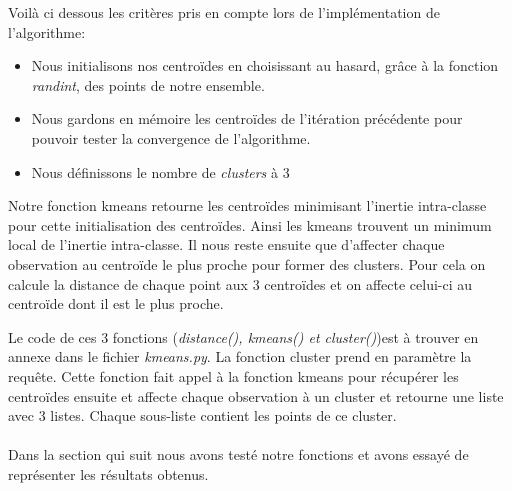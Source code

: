 \documentclass[]{report}
\begin{document}
	Voilà ci dessous les critères pris en compte lors de l'implémentation de l'algorithme:
	\begin{itemize}
		\item Nous initialisons nos centroïdes en choisissant au hasard, grâce à  la fonction \textit{randint}, des points de notre ensemble. 
		\item Nous gardons en mémoire les centroïdes de l'itération précédente pour pouvoir tester la convergence de l'algorithme.
		\item Nous définissons le nombre de \textit{clusters}  à 3
	\end{itemize}
	
	Notre fonction kmeans retourne les centroïdes minimisant l'inertie intra-classe pour cette initialisation des centroïdes. Ainsi les kmeans trouvent un minimum local de l'inertie intra-classe. Il nous reste ensuite que d'affecter chaque observation au centroïde le plus proche pour former des clusters. Pour cela on calcule la distance de chaque point aux 3 centroïdes et on affecte celui-ci au centroïde dont il est le  plus proche.\
	
	Le code de ces 3 fonctions (\textit{distance(), kmeans() et cluster()})est à trouver en annexe dans le fichier \textit{kmeans.py}. La fonction cluster prend en paramètre la requête. Cette fonction fait appel à la fonction kmeans pour récupérer les centroïdes ensuite et affecte chaque observation à un cluster et retourne une liste avec 3 listes. Chaque sous-liste contient les points de ce cluster.\\\\
	Dans la section qui suit nous avons testé notre fonctions et avons essayé de représenter les résultats obtenus.
	
\end{document}
